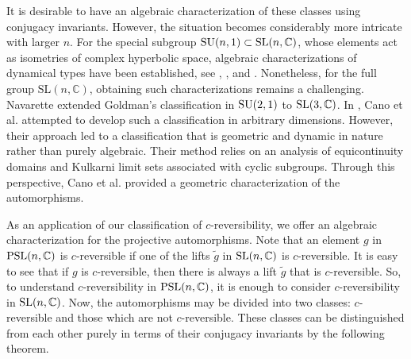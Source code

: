 \documentclass[11pt]{amsart}
\numberwithin{equation}{section}
\theoremstyle{plain}
\theoremstyle{definition}
\newcommand{\C}{\mathbb{C}}
\numberwithin{equation}{section}
\def \SL{ {\rm SL}}
\begin{document}
\medskip 
It is desirable to have an algebraic characterization of these classes using conjugacy invariants.  However, the situation becomes considerably more intricate with larger $n$. For the special subgroup ${\rm SU}(n,1) \subset \mathrm{SL}(n, \mathbb{C})$, whose elements act as isometries of complex hyperbolic space, algebraic characterizations of dynamical types have been established, see \cite{wmg}, \cite{go1}, and \cite{gpp}. Nonetheless, for the full group $\mathrm{SL}(n, \mathbb{C})$, obtaining such characterizations remains a challenging.   Navarette \cite{n} extended Goldman's classification in ${\rm SU}(2,1)$ to $\SL(3, \C)$. In \cite{clu}, Cano et al. attempted to develop such a classification in arbitrary dimensions. However, their approach led to a classification that is geometric and dynamic in nature rather than purely algebraic. Their method relies on an analysis of equicontinuity domains and Kulkarni limit sets associated with cyclic subgroups. Through this perspective, Cano et al. provided a geometric characterization of the automorphisms.

As an application of our classification of $c$-reversibility, we offer an algebraic characterization for the projective automorphisms. Note that an element $g$ in ${\rm PSL}(n, \C)$ is $c$-reversible if one of the lifts $\tilde g$ in $\SL(n, \C)$ is $c$-reversible. It is easy to see that if $g$ is $c$-reversible, then there is always a lift $\tilde g$ that is $c$-reversible. So, to understand $c$-reversibility in ${\rm PSL}(n, \C)$, it is enough to consider $c$-reversibility in $\SL(n, \C)$. Now, the automorphisms may be divided into two classes: $c$-reversible and those which are not $c$-reversible. These classes can be distinguished from each other purely in terms of their conjugacy invariants by the following theorem. 
\end{document}
